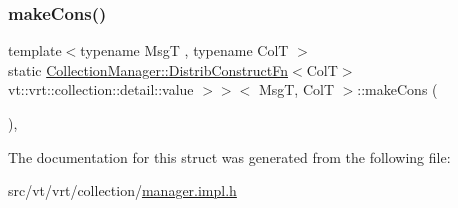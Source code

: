 \subsubsection{\texorpdfstring{make\+Cons()}{makeCons()}}
{\footnotesize\ttfamily template$<$typename MsgT , typename ColT $>$ \\
static \hyperlink{structvt_1_1vrt_1_1collection_1_1_collection_manager_a9ef5ab71e344fdee8525c3f18241c305}{Collection\+Manager\+::\+Distrib\+Construct\+Fn}$<$ColT$>$ vt\+::vrt\+::collection\+::detail\+::value $>$$>$$<$ MsgT, ColT $>$\+::make\+Cons (\begin{DoxyParamCaption}\item[{\hyperlink{namespacevt_ab2b3d506ec8e8d1540aede826d84a239}{Msg\+Shared\+Ptr}$<$ MsgT $>$}]{ }\end{DoxyParamCaption})\hspace{0.3cm}{\ttfamily [inline]}, {\ttfamily [static]}}



The documentation for this struct was generated from the following file\+:\begin{DoxyCompactItemize}
\item 
src/vt/vrt/collection/\hyperlink{vrt_2collection_2manager_8impl_8h}{manager.\+impl.\+h}\end{DoxyCompactItemize}
